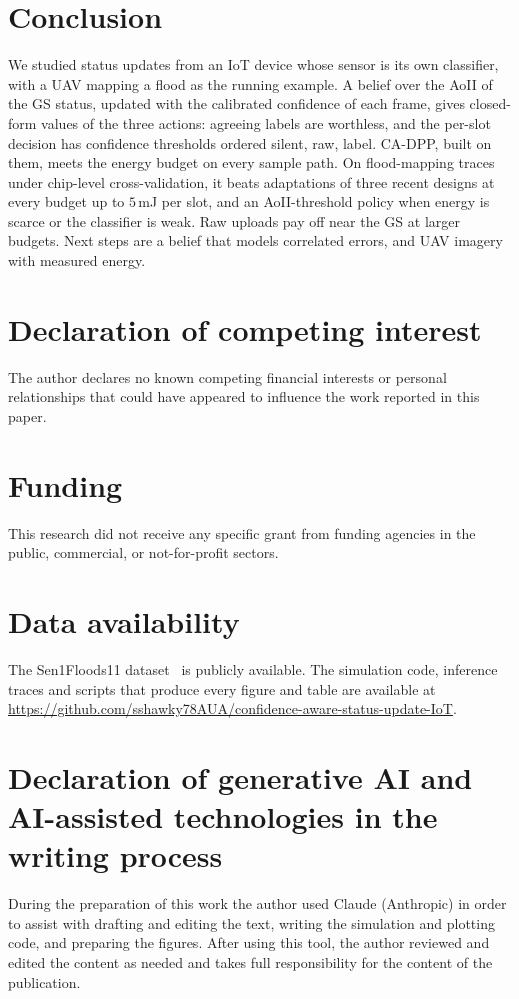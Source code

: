 \documentclass[5p,twocolumn]{elsarticle}
\theoremstyle{remark}
\begin{document}
\section{Conclusion}\label{sec:concl}
We studied status updates from an IoT device whose sensor is its own classifier, with a UAV mapping a flood as the running example. A belief over the AoII of the GS status, updated with the calibrated confidence of each frame, gives closed-form values of the three actions: agreeing labels are worthless, and the per-slot decision has confidence thresholds ordered silent, raw, label. CA-DPP, built on them, meets the energy budget on every sample path. On flood-mapping traces under chip-level cross-validation, it beats adaptations of three recent designs at every budget up to $5$\,mJ per slot, and an AoII-threshold policy when energy is scarce or the classifier is weak. Raw uploads pay off near the GS at larger budgets. Next steps are a belief that models correlated errors, and UAV imagery with measured energy.

\section*{Declaration of competing interest}
The author declares no known competing financial interests or personal relationships that could have appeared to influence the work reported in this paper.

\section*{Funding}
This research did not receive any specific grant from funding agencies in the public, commercial, or not-for-profit sectors.

\section*{Data availability}
The Sen1Floods11 dataset~\cite{bonafilia2020sen1floods11} is publicly available. The simulation code, inference traces and scripts that produce every figure and table are available at \url{https://github.com/sshawky78AUA/confidence-aware-status-update-IoT}.

\section*{Declaration of generative AI and AI-assisted technologies in the writing process}
During the preparation of this work the author used Claude (Anthropic) in order to assist with drafting and editing the text, writing the simulation and plotting code, and preparing the figures. After using this tool, the author reviewed and edited the content as needed and takes full responsibility for the content of the publication.
\end{document}
